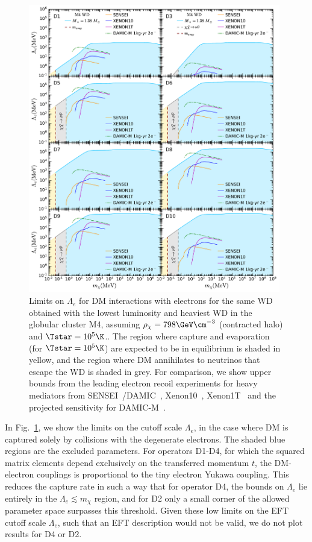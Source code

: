 \begin{figure}[t!bp]
    \centering
    \includegraphics[width=0.98\textwidth]{wd_capture/Lambda_mdm_e_limits.pdf}
    \caption{Limits on $\Lambda_e$ for DM interactions with electrons for the same WD obtained with the lowest luminosity and heaviest WD in the globular cluster M4, assuming $\rho_\chi=798\GeV\cm^{-3}$ (contracted halo) \cite{McCullough:2010ai_CaptureInelasticDark} and $\Tstar=10^5\K$.. The region where capture and evaporation (for $\Tstar=10^5\K$) are expected to be in equilibrium is shaded in yellow, and the region where DM annihilates to neutrinos that escape the WD is shaded in grey. For comparison, we show upper bounds from the leading electron recoil experiments for heavy mediators from SENSEI~\cite{SENSEI:2020dpa_oct_SENSEIDirectDetectionResults}/DAMIC~\cite{DAMIC:2019dcn_Constraintslightdark}, Xenon10~\cite{Essig:2017kqs_Newconstraintsprospects}, Xenon1T~\cite{XENON:2019gfn_Lightdarkmatter} and the projected sensitivity for DAMIC-M~\cite{Essig:2015cda_DirectdetectionsubGeV}. }
    \label{ch4:fig:Llimitse}
\end{figure}


In Fig.~\ref{ch4:fig:Llimitse}, we show the limits on the cutoff scale $\Lambda_e$, in the case where DM is captured solely by collisions with the degenerate electrons. The shaded blue regions are the excluded parameters.
For operators D1-D4, for which the squared matrix elements
depend exclusively on the transferred momentum $t$, the DM-electron couplings is proportional to the tiny electron Yukawa coupling. 
This reduces the capture rate in such a way that for operator D4, the bounds on $\Lambda_e$ lie entirely in the $\Lambda_e \lesssim m_\chi$ region, and for D2 only a small corner of the allowed parameter space surpasses this threshold. Given these low limits on the EFT cutoff scale $\Lambda_e$, such that an EFT description would not be valid, we do not plot results for D4 or D2.

